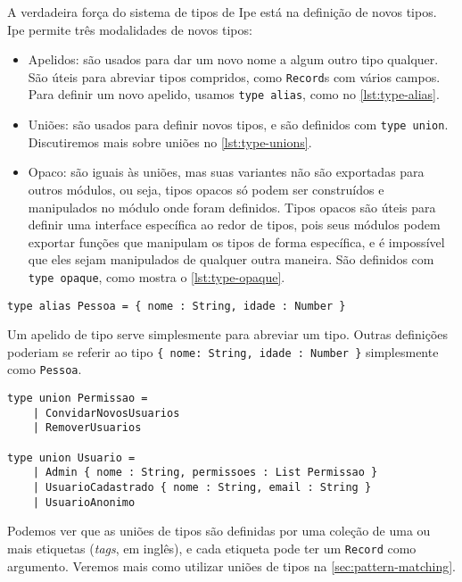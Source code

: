 A verdadeira força do sistema de tipos de Ipe está na definição de novos tipos.
Ipe permite três modalidades de novos tipos:

\begin{itemize}
    \item Apelidos: são usados para dar um novo nome a algum outro tipo qualquer.
          São úteis para abreviar tipos compridos, como \texttt{Record}s com vários
          campos. Para definir um novo apelido, usamos \texttt{type alias}, como
          no \autoref{lst:type-alias}.
    \item Uniões: são usados para definir novos tipos, e são definidos com \texttt{type union}.
          Discutiremos mais sobre uniões no \autoref{lst:type-unions}.
    \item Opaco: são iguais às uniões, mas suas variantes não são exportadas para
          outros módulos, ou seja, tipos opacos só podem ser construídos e manipulados
          no módulo onde foram definidos. Tipos opacos são úteis para definir uma interface
          específica ao redor de tipos, pois seus módulos podem exportar funções
          que manipulam os tipos de forma específica, e é impossível que eles sejam manipulados
          de qualquer outra maneira. São definidos com \texttt{type opaque}, como
          mostra o \autoref{lst:type-opaque}.
\end{itemize}


\begin{lstlisting}[label={lst:type-alias},caption={Exemplo de apelido de tipo}]
type alias Pessoa = { nome : String, idade : Number }
\end{lstlisting}

Um apelido de tipo serve simplesmente para abreviar um tipo. Outras definições
poderiam se referir ao tipo \texttt{\{ nome: String, idade : Number \}} simplesmente
como \texttt{Pessoa}.

\begin{lstlisting}[label={lst:type-unions},caption={Exemplo de união de tipos}]
type union Permissao =
    | ConvidarNovosUsuarios
    | RemoverUsuarios

type union Usuario =
    | Admin { nome : String, permissoes : List Permissao }
    | UsuarioCadastrado { nome : String, email : String }
    | UsuarioAnonimo
\end{lstlisting}

Podemos ver que as uniões de tipos são definidas por uma coleção de uma ou mais
etiquetas (\textit{tags}, em inglês), e cada etiqueta pode ter um \texttt{Record}
como argumento. Veremos mais como utilizar uniões de tipos na \autoref{sec:pattern-matching}.

